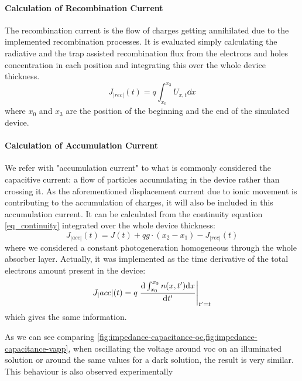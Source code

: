 	\paragraph{Calculation of Recombination Current}
	The recombination current is the flow of charges getting annihilated due to the implemented recombination processes.
	It is evaluated simply calculating the radiative and the trap assisted recombination flux from the electrons and holes concentration in each position and integrating this over the whole device thickness.
	\begin{equation}
	J_|rec|(t) = q \int_{x_0}^{x_3} U_{x,t} \dd x
	\end{equation}
	where $x_0$ and $x_3$ are the position of the beginning and the end of the simulated device.
	
	\paragraph{Calculation of Accumulation Current}
	We refer with "accumulation current" to what is commonly considered the capacitive current: a flow of particles accumulating in the device rather than crossing it. 
	As the aforementioned displacement current due to ionic movement is contributing to the accumulation of charges, it will also be included in this accumulation current.
	It can be calculated from the continuity equation \cref{eq_continuity} integrated over the whole device thickness:
\begin{equation}
				J_|acc|(t) = J(t) + qg \cdot (x_2-x_1) - J_|rec|(t)
\end{equation}
	where we considered a constant photogeneration homogeneous through the whole absorber layer.
	Actually, it was implemented as the time derivative of the total electrons amount present in the device:
	\begin{equation}
	J_|acc|(t) = q\eval{\dv{\int_{x_0}^{x_3} n(x,t') \dd x}{t'}}_{t'=t}
	\end{equation}
	which gives the same information.



As we can see comparing \cref{fig:impedance-capacitance-oc,fig:impedance-capacitance-vapp}, when oscillating the voltage around \gls{voc} on an illuminated solution or around the same values for a dark solution, the result is very similar.
This behaviour is also observed experimentally

